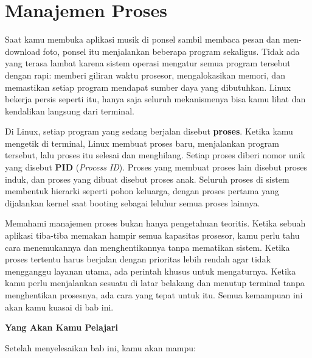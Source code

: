 
\chapter{Manajemen Proses}
\label{ch:process-management}


Saat kamu membuka aplikasi musik di ponsel sambil membaca pesan dan men-download foto,
ponsel itu menjalankan beberapa program sekaligus. Tidak ada yang terasa lambat karena
sistem operasi mengatur semua program tersebut dengan rapi: memberi giliran waktu prosesor,
mengalokasikan memori, dan memastikan setiap program mendapat sumber daya yang dibutuhkan.
Linux bekerja persis seperti itu, hanya saja seluruh mekanismenya bisa kamu lihat dan
kendalikan langsung dari terminal.

Di Linux, setiap program yang sedang berjalan disebut \textbf{proses}. Ketika kamu
mengetik  di terminal, Linux membuat proses baru, menjalankan program tersebut,
lalu proses itu selesai dan menghilang. Setiap proses diberi nomor unik yang disebut
\textbf{PID} (\textit{Process ID}). Proses yang membuat proses lain disebut proses induk,
dan proses yang dibuat disebut proses anak. Seluruh proses di sistem membentuk hierarki
seperti pohon keluarga, dengan proses pertama yang dijalankan kernel saat booting sebagai
leluhur semua proses lainnya.

Memahami manajemen proses bukan hanya pengetahuan teoritis. Ketika sebuah aplikasi tiba-tiba
memakan hampir semua kapasitas prosesor, kamu perlu tahu cara menemukannya dan menghentikannya
tanpa mematikan sistem. Ketika proses tertentu harus berjalan dengan prioritas lebih rendah
agar tidak mengganggu layanan utama, ada perintah khusus untuk mengaturnya. Ketika kamu
perlu menjalankan sesuatu di latar belakang dan menutup terminal tanpa menghentikan prosesnya,
ada cara yang tepat untuk itu. Semua kemampuan ini akan kamu kuasai di bab ini.

\textbf{Yang Akan Kamu Pelajari}

Setelah menyelesaikan bab ini, kamu akan mampu:

